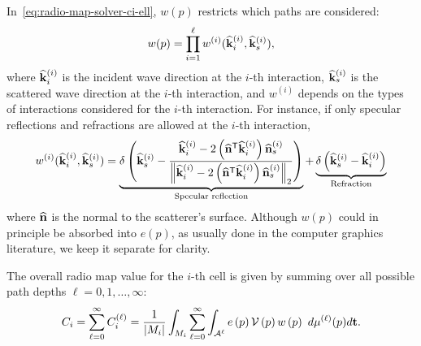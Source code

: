 In~\eqref{eq:radio-map-solver-ci-ell}, $w(p)$ restricts which paths are considered:
\begin{equation}
    \label{eq:radio-map-solver-w}
    w(p) = \prod_{i=1}^{\ell} w^{(i)}(\widehat{\mathbf{k}}_i^{(i)}, \widehat{\mathbf{k}}_s^{(i)}),
\end{equation}
where $\widehat{\mathbf{k}}_i^{(i)}$ is the incident wave direction at the $i$-th interaction, $\widehat{\mathbf{k}}_s^{(i)}$ is the scattered wave direction at the $i$-th interaction, and $w^{(i)}$ depends on the types of interactions considered for the $i$-th interaction. For instance, if only specular reflections and refractions are allowed at the $i$-th interaction,
\begin{equation}
    \label{eq:radio-map-solver-w-refl-refr}
    w^{(i)}(\widehat{\mathbf{k}}_i^{(i)}, \widehat{\mathbf{k}}_s^{(i)}) =
    \underbrace{\delta \left( \widehat{\mathbf{k}}_s^{(i)} - \frac{\widehat{\mathbf{k}}_i^{(i)} - 2\left( \widehat{\mathbf{n}}^{\mathsf{T}}\widehat{\mathbf{k}}_i^{(i)} \right) \widehat{\mathbf{n}}_s^{(i)}}{\left\lVert\widehat{\mathbf{k}}_i^{(i)} - 2\left( \widehat{\mathbf{n}}^{\mathsf{T}}\widehat{\mathbf{k}}_i^{(i)} \right) \widehat{\mathbf{n}}_s^{(i)}\right\rVert_2} \right)}_{\text{Specular reflection}}
    +
    \underbrace{\delta \left( \widehat{\mathbf{k}}_s^{(i)} - \widehat{\mathbf{k}}_i^{(i)} \right)}_{\text{Refraction}}
\end{equation}
where $\widehat{\mathbf{n}}$ is the normal to the scatterer's surface.
Although $w(p)$ could in principle be absorbed into $e(p)$, as usually done in the computer graphics literature, we keep it separate for clarity.

The overall radio map value for the $i$-th cell is given by summing over all possible path depths $\ell = 0, 1, \ldots, \infty$:
\begin{equation}
    \label{eq:radio-map-solver-ci-all}
    C_i = \sum_{\ell=0}^{\infty} C_i^{(\ell)}
        = \frac{1}{\left| M_i \right|} \int_{M_i} \sum_{\ell=0}^{\infty} \int_{{\cal A}^{\ell}} e \left( p \right) {\cal V}\left( p \right) w \left( p \right)\ d\mu^{(\ell)}(p) d\mathbf{t}.
\end{equation}

